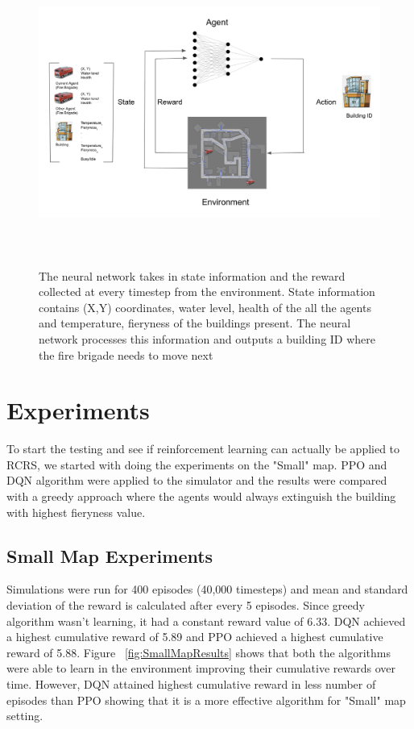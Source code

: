 \documentclass[12pt]{report}
\begin{document}
\begin{figure}[!h]
    \centering
    \includegraphics[height=10cm, width=17cm]{23}
    \caption{The neural network takes in state information and the reward collected at every timestep from the environment. State information contains (X,Y) coordinates, water level, health of the all the agents and temperature, fieryness of the buildings present. The neural network processes this information and outputs a building ID where the fire brigade needs to move next}
    \label{fig:23}
\end{figure}

\section{Experiments} \label{Experiments}

To start the testing and see if reinforcement learning can actually be applied to RCRS, we started with doing the experiments on the "Small" map. PPO and DQN algorithm were applied to the simulator and the results were compared with a greedy approach where the agents would always extinguish the building with highest fieryness value. 

\subsection{Small Map Experiments}

Simulations were run for 400 episodes (40,000 timesteps) and mean and standard deviation of the reward is calculated after every 5 episodes. Since greedy algorithm wasn't learning, it had a constant reward value of 6.33. DQN achieved a highest cumulative reward of 5.89 and PPO achieved a highest cumulative reward of 5.88. Figure ~\ref{fig:SmallMapResults} shows that both the algorithms were able to learn in the environment improving their cumulative rewards over time. However, DQN attained highest cumulative reward in less number of episodes than PPO showing that it is a more effective algorithm for "Small" map setting.  
\end{document}
